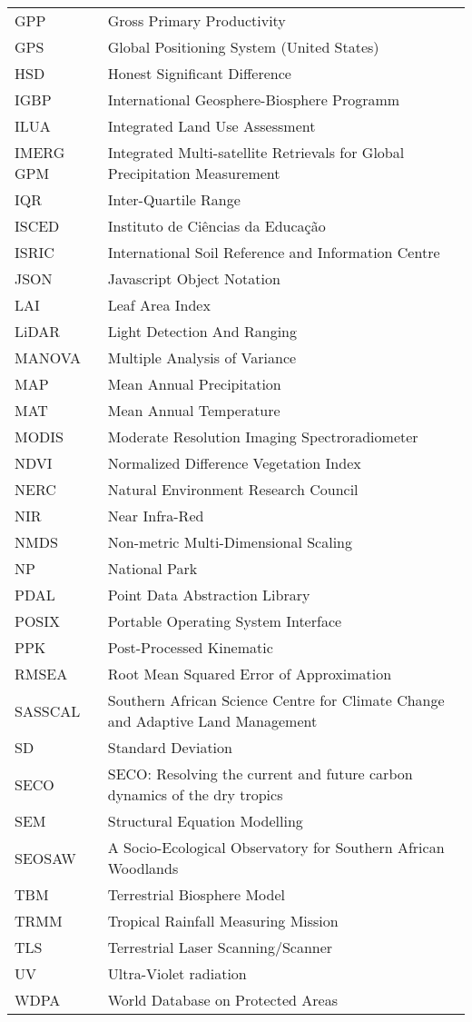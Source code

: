 \begin{longtable}{lp{11cm}}
	GPP & Gross Primary Productivity \\
	GPS & Global Positioning System (United States) \\
	HSD & Honest Significant Difference \\
	IGBP & International Geosphere-Biosphere Programm \\
	ILUA & Integrated Land Use Assessment \\
	IMERG GPM & Integrated Multi-satellite Retrievals for Global Precipitation Measurement \\
	IQR & Inter-Quartile Range \\
	ISCED & Instituto de Ci\^{e}ncias da Educa\c{c}\~{a}o  \\
	ISRIC & International Soil Reference and Information Centre \\
	JSON & Javascript Object Notation \\
	LAI & Leaf Area Index \\
	LiDAR & Light Detection And Ranging \\
	MANOVA & Multiple Analysis of Variance \\
	MAP & Mean Annual Precipitation \\
	MAT & Mean Annual Temperature \\
	MODIS & Moderate Resolution Imaging Spectroradiometer \\
	NDVI & Normalized Difference Vegetation Index \\
	NERC & Natural Environment Research Council \\
	NIR & Near Infra-Red \\
	NMDS & Non-metric Multi-Dimensional Scaling \\
	NP & National Park \\
	PDAL & Point Data Abstraction Library \\
	POSIX & Portable Operating System Interface \\
	PPK & Post-Processed Kinematic \\
	RMSEA & Root Mean Squared Error of Approximation \\
	SASSCAL & Southern African Science Centre for Climate Change and Adaptive Land Management \\
	SD & Standard Deviation \\
	SECO & SECO: Resolving the current and future carbon dynamics of the dry tropics \\ 
	SEM & Structural Equation Modelling \\
	SEOSAW & A Socio-Ecological Observatory for Southern African Woodlands \\
	TBM & Terrestrial Biosphere Model \\
	TRMM & Tropical Rainfall Measuring Mission \\
	TLS & Terrestrial Laser Scanning/Scanner \\
	UV & Ultra-Violet radiation \\
	WDPA & World Database on Protected Areas \\
\end{longtable}
